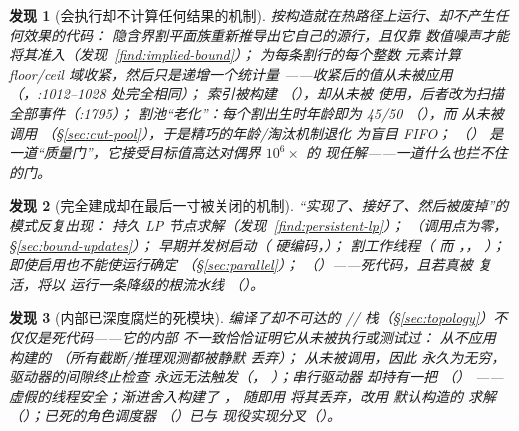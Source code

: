 \documentclass[11pt]{ctexart}
\newtheorem{finding}{发现}
\begin{document}
\begin{finding}[会执行却不计算任何结果的机制]
\label{find:phantom-work}
按构造就在热路径上运行、却不产生任何效果的代码：
隐含界割平面族重新推导出它自己的源行，且仅靠
数值噪声才能将其准入（发现~\ref{find:implied-bound}）；
 为每条割行的每个整数
元素计算 floor/ceil 域收紧，然后\emph{只是递增一个统计量}
——收紧后的值从未被应用
（，:1012--1028 处完全相同）；
 索引被构建
（），却从未被
 使用，后者改为扫描全部事件（:1795）；
割池“老化”：每个割出生时年龄即为 45/50
（），而  从未被调用
（\S\ref{sec:cut-pool}），于是精巧的年龄/淘汰机制退化
为盲目 FIFO；
（）
是一道“质量门”，它接受目标值高达对偶界 $10^6\times$ 的
现任解——一道什么也拦不住的门。
\end{finding}

\begin{finding}[完全建成却在最后一寸被关闭的机制]
\label{find:neutralized}
“实现了、接好了、然后被废掉”的模式反复出现：
持久 LP 节点求解（发现~\ref{find:persistent-lp}）；
（调用点为零，
\S\ref{sec:bound-updates}）；
早期并发树启动（
硬编码，）；
割工作线程（
而 ，，
）；
 即使启用也不能使运行确定
（\S\ref{sec:parallel}）；
（）——死代码，且若真被
复活，将以  运行一条降级的根流水线
（）。
\end{finding}

\begin{finding}[内部已深度腐烂的死模块]
\label{find:dead-modules}
编译了却不可达的 //
栈（\S\ref{sec:topology}）不仅仅是死代码——它的内部
不一致恰恰证明它从未被执行或测试过：
 从不应用  构建的
（所有截断/推理观测都被静默
丢弃）； 从未被调用，因此
 永久为无穷，驱动器的间隙终止检查
永远无法触发（，
）；\emph{串行}驱动器
却持有一把 （）
——虚假的线程安全；渐进舍入构建了 ，
随即用  将其丢弃，改用
默认构造的  求解
（）；已死的角色调度器
（）已与
现役实现分叉（）。
\end{finding}
\end{document}
